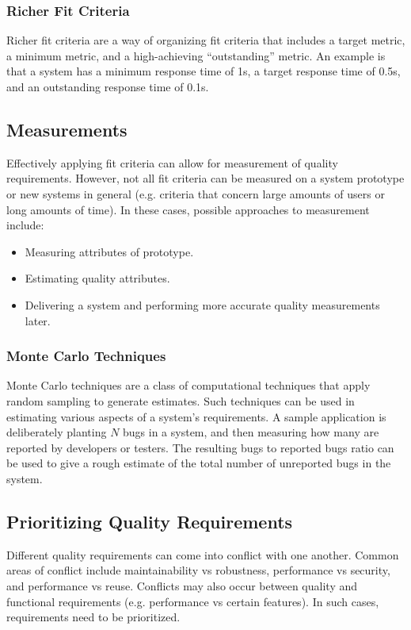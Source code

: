 \documentclass[12pt,titlepage]{article}
\begin{document}
      \subsubsection{Richer Fit Criteria}
        Richer fit criteria are a way of organizing fit criteria that includes a target metric, a minimum metric, and a high-achieving ``outstanding''
        metric. An example is that a system has a minimum response time of 1s, a target response time of 0.5s, and an outstanding response time
        of 0.1s.

    \subsection{Measurements}
      Effectively applying fit criteria can allow for measurement of quality requirements. However, not all fit criteria can be measured on a system
      prototype or new systems in general (e.g. criteria that concern large amounts of users or long amounts of time). In these cases, possible approaches
      to measurement include:
      \begin{itemize}
        \item Measuring attributes of prototype.
        \item Estimating quality attributes.
        \item Delivering a system and performing more accurate quality measurements later.
      \end{itemize}

      \subsubsection{Monte Carlo Techniques}
        Monte Carlo techniques are a class of computational techniques that apply random sampling to generate estimates. Such techniques can be used in
        estimating various aspects of a system's requirements. A sample application is deliberately planting $N$ bugs in a system, and then measuring how
        many are reported by developers or testers. The resulting bugs to reported bugs ratio can be used to give a rough estimate of the total number of
        unreported bugs in the system.

    \subsection{Prioritizing Quality Requirements}
      Different quality requirements can come into conflict with one another. Common areas of conflict include maintainability vs robustness, performance
      vs security, and performance vs reuse. Conflicts may also occur between quality and functional requirements (e.g. performance vs certain features).
      In such cases, requirements need to be prioritized.
\end{document}
